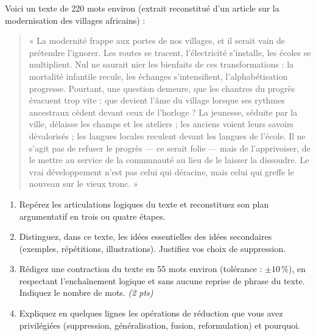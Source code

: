 \documentclass[11pt]{article}
\begin{document}
\begin{exercice}
Voici un texte de 220 mots environ (extrait reconstitué d'un article sur la modernisation des villages africains) :

\begin{quote}
« La modernité frappe aux portes de nos villages, et il serait vain de prétendre l'ignorer. Les routes se tracent, l'électricité s'installe, les écoles se multiplient. Nul ne saurait nier les bienfaits de ces transformations : la mortalité infantile recule, les échanges s'intensifient, l'alphabétisation progresse. Pourtant, une question demeure, que les chantres du progrès évacuent trop vite : que devient l'âme du village lorsque ses rythmes ancestraux cèdent devant ceux de l'horloge ? La jeunesse, séduite par la ville, délaisse les champs et les ateliers ; les anciens voient leurs savoirs dévalorisés ; les langues locales reculent devant les langues de l'école. Il ne s'agit pas de refuser le progrès — ce serait folie — mais de l'apprivoiser, de le mettre au service de la communauté au lieu de le laisser la dissoudre. Le vrai développement n'est pas celui qui déracine, mais celui qui greffe le nouveau sur le vieux tronc. »
\end{quote}

\begin{enumerate}
  \item Repérez les articulations logiques du texte et reconstituez son plan argumentatif en trois ou quatre étapes.
  \item Distinguez, dans ce texte, les idées essentielles des idées secondaires (exemples, répétitions, illustrations). Justifiez vos choix de suppression.
  \item Rédigez une contraction du texte en 55 mots environ (tolérance : $\pm 10\,\%$), en respectant l'enchaînement logique et sans aucune reprise de phrase du texte. Indiquez le nombre de mots. \emph{(2 pts)}
  \item Expliquez en quelques lignes les opérations de réduction que vous avez privilégiées (suppression, généralisation, fusion, reformulation) et pourquoi.
\end{enumerate}
\end{exercice}
\end{document}
